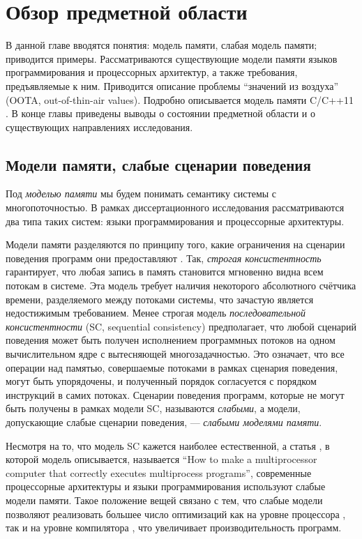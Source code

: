 \chapter{Обзор предметной области} \label{sec:overview}
В данной главе вводятся понятия: модель памяти, слабая модель памяти;
приводится примеры.
Рассматриваются существующие модели памяти языков программирования и
процессорных архитектур, а также требования, предъявляемые к ним.
Приводится описание проблемы ``значений из воздуха'' (OOTA, out-of-thin-air values).
Подробно описывается модель памяти C/C++11 \cite{Batty-al:POPL11}.
В конце главы приведены выводы о состоянии предметной области и о существующих
направлениях исследования.

\section{Модели памяти, слабые сценарии поведения}
Под \emph{моделью памяти} мы будем понимать семантику системы с многопоточностью.
В рамках диссертационного исследования рассматриваются два типа таких систем:
языки программирования и процессорные архитектуры.

Модели памяти разделяются по принципу того, какие ограничения на сценарии поведения
программ они предоставляют \cite{Kshemkalyani-Singhal:2011}.
Так, \emph{строгая консистентность} гарантирует, что любая запись в память становится мгновенно видна
всем потокам в системе. Эта модель требует наличия некоторого абсолютного счётчика времени, разделяемого между потоками системы,
что зачастую является недостижимым требованием. Менее строгая модель \emph{последовательной консистентности} \cite{Lamport:TC79}
(SC, sequential consistency)
предполагает, что любой сценарий поведения может быть получен исполнением программных потоков на одном вычислительном
ядре с вытесняющей многозадачностью. Это означает, что все операции над памятью, совершаемые потоками в рамках сценария поведения,
могут быть упорядочены, и полученный порядок согласуется с порядком инструкций в самих потоках.
Сценарии поведения программ, которые не могут быть получены в рамках модели SC, называются
\emph{слабыми}, а модели, допускающие слабые сценарии поведения, --- \emph{слабыми моделями памяти}.

Несмотря на то, что модель SC кажется наиболее естественной, а статья \cite{Lamport:TC79},
в которой модель описывается, называется ``How to make a multiprocessor computer that correctly executes multiprocess programs'',
современные процессорные архитектуры и языки программирования используют слабые модели памяти. Такое положение вещей
связано с тем, что слабые модели позволяют реализовать большее число оптимизаций как на уровне процессора
\cite{Hennessy-Patterson:BOOK}, так и на уровне компилятора \cite{Aho-al:BOOK86,Muchnick:BOOK97},
что увеличивает производительность программ.

